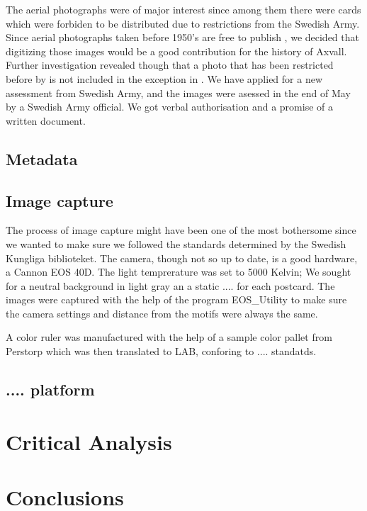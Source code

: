 \documentclass[12 pt]{paper}
\begin{document}
The aerial photographs were of major interest since among them there were cards  which were forbiden to be distributed due to restrictions from the Swedish Army. Since aerial photographs taken before 1950's are free to publish \autocite[][kap. 3, 3§]{lantm2018}, we decided that digitizing those images would be a good contribution for the history of Axvall. Further investigation revealed though that a photo that has been restricted before by is not included in the exception in \textcite{lantm2018}. We have applied for a new assessment from Swedish Army, and the images were asessed in the end of May by a Swedish Army official. We got verbal authorisation and a promise of a written document.
\subsection{Metadata}

\subsection{Image capture}
The process of image capture might have been one of the most bothersome since we wanted to make sure we followed the standards determined by the Swedish Kungliga biblioteket. The camera, though not so up to date, is a good hardware, a Cannon EOS 40D. The light temprerature was set to 5000 Kelvin; We sought for a neutral background in light gray an a static .... for each postcard. The images were captured with the help of the program EOS_Utility to make sure the camera settings and distance from the motifs were always the same. 

A color ruler was manufactured with the help of a sample color pallet from Perstorp which was then translated to LAB, conforing to .... standatds. 
\subsection{.... platform}%

\section {Critical Analysis}


\section{Conclusions}


\newpage

%
%
\printbibliography
\end{document}

